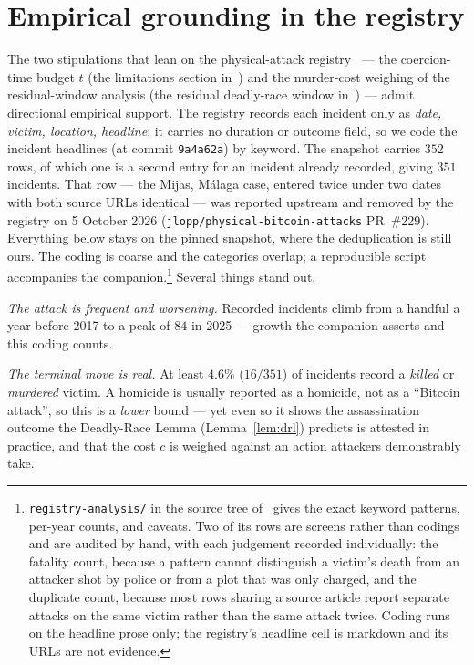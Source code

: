 \section{Empirical grounding in the registry}
\label{sec:registry}


The two stipulations that lean on the physical-attack registry~\cite{lopp-attacks}
--- the coercion-time budget $t$ (the limitations section in~\cite{deadly-race}) and the murder-cost weighing of the
residual-window analysis (the residual deadly-race window in~\cite{deadly-race}) --- admit directional empirical support. The registry records each
incident only as \emph{date, victim, location, headline}; it carries no duration or
outcome field, so we code the incident headlines (at commit \texttt{9a4a62a}) by
keyword. The snapshot carries $352$ rows, of which one is a second entry for an
incident already recorded, giving $351$ incidents. That row --- the Mijas,
M\'alaga case, entered twice under two dates with both source URLs identical ---
was reported upstream and removed by the registry on 5 October 2026
(\texttt{jlopp/physical-bitcoin-attacks} PR~\#229). Everything below stays on
the pinned snapshot, where the deduplication is still ours. The coding is coarse and the
categories overlap; a reproducible script accompanies the
companion.\footnote{\texttt{registry-analysis/} in the source tree
of~\cite{deadly-race} gives the exact keyword patterns, per-year counts, and
caveats. Two of its rows are screens rather than codings and are audited by
hand, with each judgement recorded individually: the fatality count, because a
pattern cannot distinguish a victim's death from an attacker shot by police or
from a plot that was only charged, and the duplicate count, because most rows
sharing a source article report separate attacks on the same victim rather than
the same attack twice. Coding runs on the headline prose only; the registry's
headline cell is markdown and its URLs are not evidence.} Several things stand
out.

\emph{The attack is frequent and worsening.} Recorded incidents climb from a handful
a year before 2017 to a peak of $84$ in 2025 --- growth the companion asserts and
this coding counts.

\emph{The terminal move is real.} At least $4.6\%$ ($16/351$) of incidents record a
\emph{killed} or \emph{murdered} victim. A homicide is usually reported as a homicide,
not as a ``Bitcoin attack'', so this is a \emph{lower} bound --- yet even so it shows
the assassination outcome the Deadly-Race Lemma (Lemma~\ref{lem:drl}) predicts is
attested in practice, and that the cost $c$ is weighed against an action attackers
demonstrably take.

